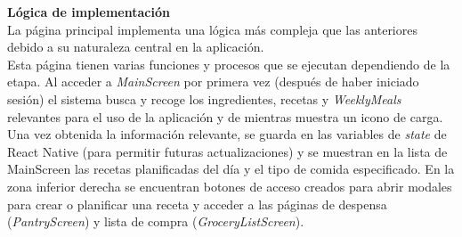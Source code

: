 \documentclass[twoside, openright, 11pt]{report}
\begin{document}
					\textbf{Lógica de implementación}\\
					La página principal implementa una lógica más compleja que las anteriores debido a su naturaleza central en la aplicación.
					\\
					Esta página tienen varias funciones y procesos que se ejecutan dependiendo de la etapa. Al acceder a \textit{MainScreen} por primera vez (después de haber iniciado sesión) el sistema busca y recoge los ingredientes, recetas y \textit{WeeklyMeals} relevantes para el uso de la aplicación y de mientras muestra un icono de carga. Una vez obtenida la información relevante, se guarda en las variables de \textit{state} de React Native (para permitir futuras actualizaciones) y se muestran en la lista de MainScreen las recetas planificadas del día y el tipo de comida especificado.
					En la zona inferior derecha se encuentran botones de acceso creados para abrir modales para crear o planificar una receta y acceder a las páginas de despensa (\textit{PantryScreen}) y lista de compra (\textit{GroceryListScreen}).
					
\end{document}
